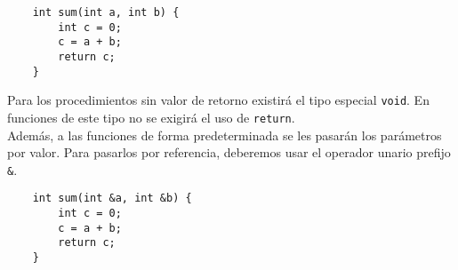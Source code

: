 \documentclass[10pt a4paper]{article}
\newcommand{\code}[1]{\colorbox{light-gray}{\texttt{#1}}}
\numberwithin{equation}{section}
\begin{document}
\begin{verbatim}
    int sum(int a, int b) {
        int c = 0;
        c = a + b;
        return c;
    }
\end{verbatim}

Para los procedimientos sin valor de retorno existirá el tipo especial \code{void}. En funciones de este tipo no se exigirá el uso de \code{return}. \\
\newline
Además, a las funciones de forma predeterminada se les pasarán los parámetros por valor. Para pasarlos por referencia, deberemos usar el operador unario prefijo \code{\&}.

\begin{verbatim}
    int sum(int &a, int &b) {
        int c = 0;
        c = a + b;
        return c;
    }
\end{verbatim}
\end{document}
